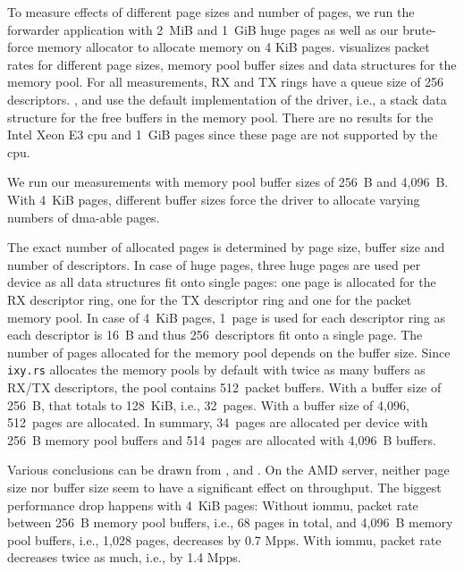 To measure effects of different page sizes and number of pages, we run the
forwarder application with 2~MiB and 1~GiB huge pages as well as our brute-force
memory allocator to allocate memory on 4 KiB pages.
 visualizes packet rates for different page
sizes, memory pool buffer sizes and data structures for the memory pool. For all
measurements, RX and TX rings have a queue size of 256 descriptors.
,  and
 use the default implementation of the driver,
i.e., a stack data structure for the free buffers in the memory pool. There are
no results for the Intel Xeon E3 \ac{cpu} and 1~GiB pages since these page are
not supported by the \ac{cpu}.

We run our measurements with memory pool buffer sizes of 256~B and 4,096~B. With
4~KiB pages, different buffer sizes force the driver to allocate varying numbers
of \ac{dma}-able pages.

The exact number of allocated pages is determined by page size, buffer size and
number of descriptors. In case of huge pages, three huge pages are used per
device as all data structures fit onto single pages: one page is allocated for
the RX descriptor ring, one for the TX descriptor ring and one for the packet
memory pool. In case of 4~KiB pages, 1~page is used for each descriptor ring as
each descriptor is 16~B and thus 256~descriptors fit onto a single page. The
number of pages allocated for the memory pool depends on the buffer size. Since
\texttt{ixy.rs} allocates the memory pools by default with twice as many buffers
as RX/TX descriptors, the pool contains 512~packet buffers. With a buffer size
of 256~B, that totals to 128~KiB, i.e., 32~pages. With a buffer size of 4,096,
512~pages are allocated. In summary, 34~pages are allocated per device with
256~B memory pool buffers and 514~pages are allocated with 4,096~B buffers.

Various conclusions can be drawn from ,
 and . On
the AMD server, neither page size nor buffer size seem to have a significant
effect on throughput. The biggest performance drop happens with 4~KiB pages:
Without \ac{iommu}, packet rate between 256~B memory pool buffers, i.e., 68
pages in total, and 4,096~B memory pool buffers, i.e., 1,028 pages, decreases by
0.7 Mpps. With \ac{iommu}, packet rate decreases twice as much, i.e., by 1.4
Mpps.

